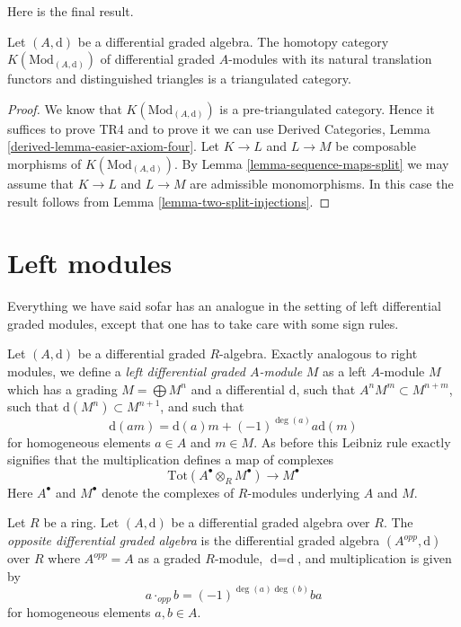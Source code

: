 \noindent
Here is the final result.

\begin{proposition}
\label{proposition-homotopy-category-triangulated}
Let $(A, \text{d})$ be a differential graded algebra. The homotopy category
$K(\text{Mod}_{(A, \text{d})})$ of differential graded $A$-modules with its
natural translation functors and distinguished triangles is a triangulated
category.
\end{proposition}

\begin{proof}
We know that $K(\text{Mod}_{(A, \text{d})})$ is a pre-triangulated category.
Hence it suffices to prove TR4 and to prove it we can use
Derived Categories, Lemma \ref{derived-lemma-easier-axiom-four}.
Let $K \to L$ and $L \to M$ be composable morphisms of
$K(\text{Mod}_{(A, \text{d})})$. By
Lemma \ref{lemma-sequence-maps-split} we may assume that
$K \to L$ and $L \to M$ are admissible monomorphisms.
In this case the result follows from
Lemma \ref{lemma-two-split-injections}.
\end{proof}











\section{Left modules}
\label{section-left-modules}

\noindent
Everything we have said sofar has an analogue in the setting
of left differential graded modules, except that one has to
take care with some sign rules.

\medskip\noindent
Let $(A, \text{d})$ be a differential graded $R$-algebra.
Exactly analogous to right modules, we define a
{\it left differential graded $A$-module} $M$ as a left
$A$-module $M$ which has a grading $M = \bigoplus M^n$
and a differential $\text{d}$, such that $A^n M^m \subset M^{n + m}$,
such that $\text{d}(M^n) \subset M^{n + 1}$, and such that
$$
\text{d}(am) = \text{d}(a) m + (-1)^{\deg(a)}a \text{d}(m)
$$
for homogeneous elements $a \in A$ and $m \in M$. As before this
Leibniz rule exactly signifies that the multiplication defines
a map of complexes
$$
\text{Tot}(A^\bullet \otimes_R M^\bullet) \to M^\bullet
$$
Here $A^\bullet$ and $M^\bullet$ denote the complexes of $R$-modules
underlying $A$ and $M$.

\begin{definition}
\label{definition-opposite-dga}
Let $R$ be a ring. Let $(A, \text{d})$ be a differential graded algebra
over $R$. The {\it opposite differential graded algebra} is the differential
graded algebra $(A^{opp}, \text{d})$ over $R$ where $A^{opp} = A$
as a graded $R$-module, $\text{d} = \text{d}$, and multiplication is
given by
$$
a \cdot_{opp} b = (-1)^{\deg(a)\deg(b)} b a
$$
for homogeneous elements $a, b \in A$.
\end{definition}

